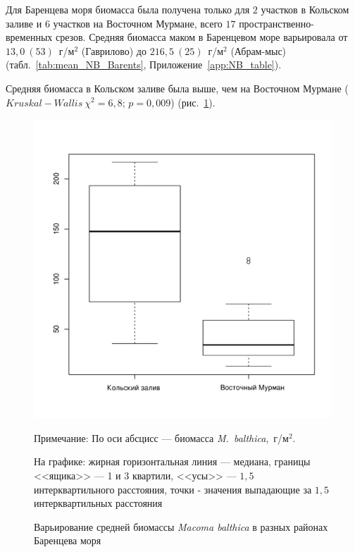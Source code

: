 Для Баренцева моря биомасса была получена только для $2$ участков в Кольском заливе и $6$ участков на Восточном Мурмане, всего $17$ про\-стран\-ствен\-но-вре\-мен\-ных срезов. 
Средняя биомасса маком в Баренцевом море варьировала от $13,0~(53)$~г/м$^2$ (Гаврилово) до $216,5~(25)$~г/м$^2$ (Абрам-мыс) (табл.~\ref{tab:mean_NB_Barents}, Приложение~\ref{app:NB_table}).

Средняя биомасса в Кольском заливе была выше, чем на Восточном Мурмане ($Kruskal-Wallis~\chi^2 = 6,8$; $p = 0,009$) (рис.~\ref{ris:B_region_Barents}).
	\begin{figure}[hp]
	\begin{center}	
		\includegraphics[height=0.5\textheight]{../All_B/Bmean_region_Barents1.pdf}
	\end{center}
	\caption{Варьирование средней биомассы {\it Macoma balthica} в разных районах Баренцева моря}
	{\footnotesize Примечание: По оси абсцисс --- биомасса {\it M.~balthica},~г/м$^2$.

	На графике: жирная горизонтальная линия --- медиана, границы <<ящика>> --- 1 и 3 квартили, <<усы>> --- $1,5$ интерквартильного расстояния, точки - значения выпадающие за $1,5$ интерквартильных расстояния}
	\label{ris:B_region_Barents}
	\end{figure}




